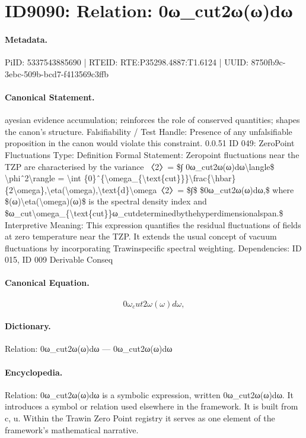 \section*{ID9090: Relation: 0ω\_cut2ω(ω)dω}
\paragraph{Metadata.}
PiID: 5337543885690 | RTEID: RTE:P35298.4887:T1.6124 | UUID: 8750fb9c-3ebc-509b-bcd7-f413569c3ffb

\paragraph{Canonical Statement.}
ayesian evidence accumulation; reinforces the role of conserved quantities; shapes the canon’s structure. Falsifiability / Test Handle: Presence of any unfalsifiable proposition in the canon would violate this constraint. 0.0.51 ID 049: ZeroPoint Fluctuations Type: Definition Formal Statement: Zeropoint fluctuations near the TZP are characterised by the variance 〈2〉= \$∫ 0ω\_cut2ω(ω)dω\textbackslash{}langle\$ \textbackslash{}phiˆ2\textbackslash{}rangle = \textbackslash{}int \{0\}ˆ\{\textbackslash{}omega\_\{\textbackslash{}text\{cut\}\}\}\textbackslash{}frac\{\textbackslash{}hbar\}\{2\textbackslash{}omega\},\textbackslash{}eta(\textbackslash{}omega),\textbackslash{}text\{d\}\textbackslash{}omega〈2〉= \$∫\$ \$0ω\_cut2ω(ω)dω,\$ where \$(ω)\textbackslash{}eta(\textbackslash{}omega)(ω)\$ is the spectral density index and \$ω\_cut\textbackslash{}omega\_\{\textbackslash{}text\{cut\}\}ω\_cutdeterminedbythehyperdimensionalspan.\$ Interpretive Meaning: This expression quantifies the residual fluctuations of fields at zero temperature near the TZP. It extends the usual concept of vacuum fluctuations by incorporating Trawinspecific spectral weighting. Dependencies: ID 015, ID 009 Derivable Conseq

\paragraph{Canonical Equation.}
\[
0ω_cut2ω(ω)dω,
\]

\paragraph{Dictionary.}
Relation: 0ω\_cut2ω(ω)dω — 0ω\_cut2ω(ω)dω

\paragraph{Encyclopedia.}
Relation: 0ω\_cut2ω(ω)dω is a symbolic expression, written 0ω\_cut2ω(ω)dω. It introduces a symbol or relation used elsewhere in the framework. It is built from c, u. Within the Trawin Zero Point registry it serves as one element of the framework's mathematical narrative.
